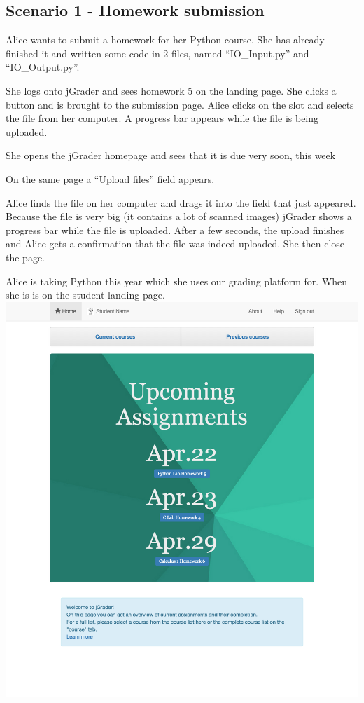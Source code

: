 \subsection{Scenario 1 - Homework submission}

Alice wants to submit a homework for her Python course. She has already finished it and written some code in 2 files, named ``IO\_Input.py'' and ``IO\_Output.py''.

She logs onto jGrader and sees homework 5 on the landing page. She clicks a button and is brought to the submission page. Alice clicks on the slot and selects the file from her computer. A progress bar appears while the file is being uploaded.

She opens the jGrader homepage and sees that it is due very soon, this week

On the same page a ``Upload files'' field appears.

Alice finds the file on her computer and drags it into the field that just appeared. Because the file is very big (it contains a lot of scanned images) jGrader shows a progress bar while the file is uploaded. After a few seconds, the upload finishes and Alice gets a confirmation that the file was indeed uploaded. She then close the page.


Alice is taking Python this year which she uses our grading platform for. When she is is on the student landing page.\\
\includegraphics{screenshots/StudentLandingPage.png}\\

